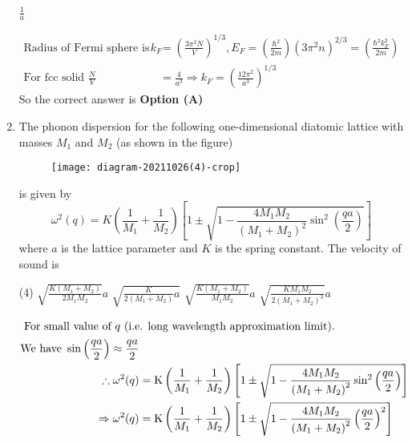 \begin{enumerate}
\begin{tasks}
\task[\textbf{D.}] $\frac{1}{a}$
\end{tasks}
\begin{answer}
\begin{align*}
\text{Radius of Fermi sphere is }k_{F}&=\left(\frac{3 \pi^{2} N}{V}\right)^{1 / 3}, E_{F}=\left(\frac{\hbar^{2}}{2 m}\right)\left(3 \pi^{2} n\right)^{2 / 3}=\left(\frac{\hbar^{2} k_{F}^{2}}{2 m}\right)\\
\text{For fcc solid }\frac{N}{V}&=\frac{4}{a^{3}} \Rightarrow k_{F}=\left(\frac{12 \pi^{2}}{a^{3}}\right)^{1 / 3}
\end{align*}
So the correct answer is \textbf{Option (A)}
\end{answer}
	\item The phonon dispersion for the following one-dimensional diatomic lattice with masses $M_{1}$ and $M_{2}$ (as shown in the figure)\\
	\begin{figure}[H]
		\centering
		\texttt{[image: diagram-20211026(4)-crop]}
	\end{figure}
	is given by
	$$
	\omega^{2}(q)=K\left(\frac{1}{M_{1}}+\frac{1}{M_{2}}\right)\left[1 \pm \sqrt{1-\frac{4 M_{1} M_{2}}{\left(M_{1}+M_{2}\right)^{2}} \sin ^{2}\left(\frac{q a}{2}\right)}\right]
	$$
	where $a$ is the lattice parameter and $K$ is the spring constant. The velocity of sound is
	{}
\begin{tasks}(4)
\task[\textbf{A.}] $\sqrt{\frac{K\left(M_{1}+M_{2}\right)}{2 M_{1} M_{2}}} a$
\task[\textbf{B.}] $\sqrt{\frac{K}{2\left(M_{1}+M_{2}\right)} a}$
\task[\textbf{C.}] $\sqrt{\frac{K\left(M_{1}+M_{2}\right)}{M_{1} M_{2}}} a$
\task[\textbf{D.}] $\sqrt{\frac{K M_{1} M_{2}}{2\left(M_{1}+M_{2}\right)^{3}}} a$
\end{tasks}
\begin{answer}
\begin{align*}
\intertext{	For small value of $q$ (i.e. long wavelength approximation limit).}
\text{We have }\sin \left(\frac{q a}{2}\right) \approx \frac{q a}{2}\\
\therefore \omega^{2}(q)&=\mathrm{K}\left(\frac{1}{M_{1}}+\frac{1}{M_{2}}\right)\left[1 \pm \sqrt{1-\frac{4 M_{1} M_{2}}{\left(M_{1}+M_{2}\right)^{2}} \sin ^{2}\left(\frac{q a}{2}\right)}\right]\\
\Rightarrow \omega^{2}(q)&=\mathrm{K}\left(\frac{1}{M_{1}}+\frac{1}{M_{2}}\right)\left[1 \pm \sqrt{1-\frac{4 M_{1} M_{2}}{\left(M_{1}+M_{2}\right)^{2}}\left(\frac{q a}{2}\right)^{2}}\right]\\

\end{align*}
\end{answer}
\end{enumerate}
